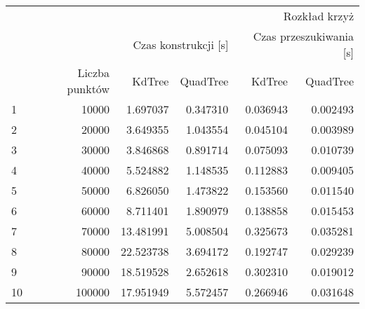 \begin{tabular}{lrrrrr}
\toprule
 & \multicolumn{5}{r}{Rozkład krzyż} \\
 &  & \multicolumn{2}{r}{Czas konstrukcji [s]} & \multicolumn{2}{r}{Czas przeszukiwania [s]} \\
 & Liczba punktów & KdTree & QuadTree & KdTree & QuadTree \\
\midrule
1 & 10000 & 1.697037 & 0.347310 & 0.036943 & 0.002493 \\
2 & 20000 & 3.649355 & 1.043554 & 0.045104 & 0.003989 \\
3 & 30000 & 3.846868 & 0.891714 & 0.075093 & 0.010739 \\
4 & 40000 & 5.524882 & 1.148535 & 0.112883 & 0.009405 \\
5 & 50000 & 6.826050 & 1.473822 & 0.153560 & 0.011540 \\
6 & 60000 & 8.711401 & 1.890979 & 0.138858 & 0.015453 \\
7 & 70000 & 13.481991 & 5.008504 & 0.325673 & 0.035281 \\
8 & 80000 & 22.523738 & 3.694172 & 0.192747 & 0.029239 \\
9 & 90000 & 18.519528 & 2.652618 & 0.302310 & 0.019012 \\
10 & 100000 & 17.951949 & 5.572457 & 0.266946 & 0.031648 \\
\bottomrule
\end{tabular}
